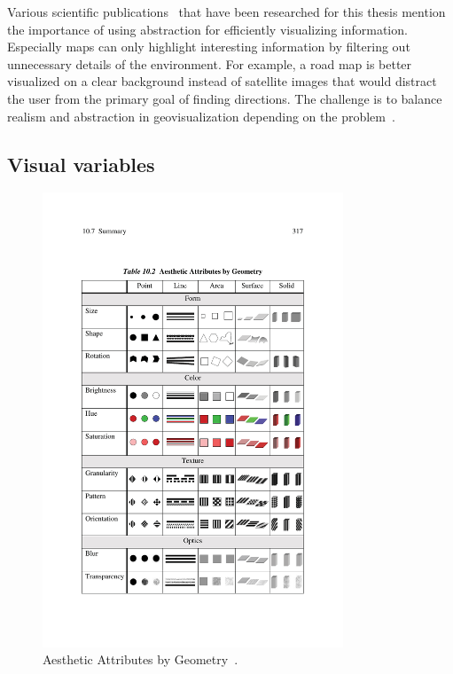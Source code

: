 Various scientific publications~\cite{phillips82clutter, MACEACHREN90apattern, keim2001vis, harvey2008primer, ellis08clutter, Delort10vis, noellenburg11geovis} that have been researched for this thesis mention the importance of using abstraction for efficiently visualizing information. Especially maps can only highlight interesting information by filtering out unnecessary details of the environment. For example, a road map is better visualized on a clear background instead of satellite images that would distract the user from the primary goal of finding directions. The challenge is to balance realism and abstraction in geovisualization depending on the problem~\cite{noellenburg11geovis}.

\subsection{Visual variables}
\label{chapter:vis-variables}

\begin{figure}[h]
  \begin{center}
    \includegraphics[width=0.8\textwidth]{figures/aesthetic_attributes.pdf}
    \caption{Aesthetic Attributes by Geometry~\cite{Wilkinson05grammar}.}
    \label{fig:aesthetic-attributes}
  \end{center}
\end{figure}


